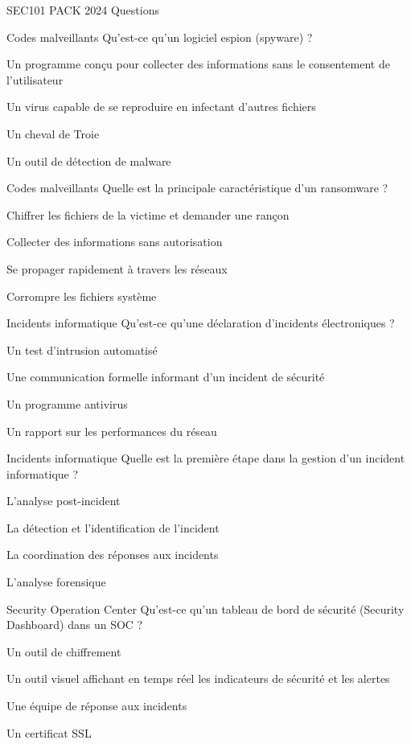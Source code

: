 \documentclass[12pt]{article}
\begin{document}
\begin{quiz}{SEC101 PACK 2024 Questions}
\begin{multi}[points=1]{Codes malveillants}
Qu'est-ce qu'un logiciel espion (spyware) ?
    \item *Un programme conçu pour collecter des informations sans le consentement de l'utilisateur
    \item Un virus capable de se reproduire en infectant d'autres fichiers
    \item Un cheval de Troie
    \item Un outil de détection de malware
\end{multi}

\begin{multi}[points=1]{Codes malveillants}
Quelle est la principale caractéristique d'un ransomware ?
    \item *Chiffrer les fichiers de la victime et demander une rançon
    \item Collecter des informations sans autorisation
    \item Se propager rapidement à travers les réseaux
    \item Corrompre les fichiers système
\end{multi}

\begin{multi}[points=1]{Incidents informatique}
Qu'est-ce qu'une déclaration d'incidents électroniques ?
    \item Un test d'intrusion automatisé
    \item *Une communication formelle informant d'un incident de sécurité
    \item Un programme antivirus
    \item Un rapport sur les performances du réseau
\end{multi}

\begin{multi}[points=1]{Incidents informatique}
Quelle est la première étape dans la gestion d'un incident informatique ?
    \item L'analyse post-incident
    \item *La détection et l'identification de l'incident
    \item La coordination des réponses aux incidents
    \item L'analyse forensique
\end{multi}

\begin{multi}[points=1]{Security Operation Center}
Qu'est-ce qu'un tableau de bord de sécurité (Security Dashboard) dans un SOC ?
    \item Un outil de chiffrement
    \item *Un outil visuel affichant en temps réel les indicateurs de sécurité et les alertes
    \item Une équipe de réponse aux incidents
    \item Un certificat SSL
\end{multi}


\end{quiz}
\end{document}
